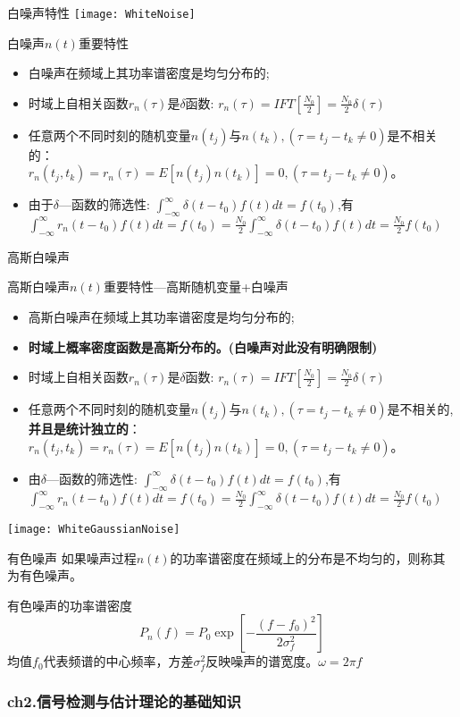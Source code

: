 \begin{frame}{白噪声特性}
\texttt{[image: WhiteNoise]}
\begin{block}{白噪声$n(t)$重要特性}
	\begin{itemize}
		\item 白噪声在频域上其功率谱密度是均匀分布的;
		\item 时域上自相关函数$r_n(\tau)$是$\delta$函数: $r_n(\tau)=IFT[\frac{N_0}{2}]=\frac{N_0}{2}\delta(\tau)$
		\item 任意两个不同时刻的随机变量$n(t_j)$与$n(t_k),(\tau=t_j-t_k\ne 0)$是不相关的：\\
		$r_n(t_j,t_k)=r_n(\tau)=E[n(t_j)n(t_k)]=0,(\tau=t_j-t_k\ne 0)$。
		\item 由于$\delta$---函数的筛选性: $\int_{-\infty}^{\infty}\delta(t-t_0)f(t)dt=f(t_0)$,有\\
		$\int_{-\infty}^{\infty}r_n(t-t_0)f(t)dt=f(t_0)=\frac{N_0}{2}\int_{-\infty}^{\infty}\delta(t-t_0)f(t)dt=\frac{N_0}{2}f(t_0)$
	\end{itemize}	
\end{block}
\end{frame}

\begin{frame}{高斯白噪声}
\begin{block}{高斯白噪声$n(t)$重要特性---高斯随机变量+白噪声}
	\begin{itemize}
		\item 高斯白噪声在频域上其功率谱密度是均匀分布的;
		\item \textbf{时域上概率密度函数是高斯分布的。(白噪声对此没有明确限制)}
		\item 时域上自相关函数$r_n(\tau)$是$\delta$函数: $r_n(\tau)=IFT[\frac{N_0}{2}]=\frac{N_0}{2}\delta(\tau)$
		\item 任意两个不同时刻的随机变量$n(t_j)$与$n(t_k),(\tau=t_j-t_k\ne 0)$是不相关的,\textbf{并且是统计独立的}：\\
		$r_n(t_j,t_k)=r_n(\tau)=E[n(t_j)n(t_k)]=0,(\tau=t_j-t_k\ne 0)$。
		\item 由$\delta$---函数的筛选性: $\int_{-\infty}^{\infty}\delta(t-t_0)f(t)dt=f(t_0)$,有\\
		$\int_{-\infty}^{\infty}r_n(t-t_0)f(t)dt=f(t_0)=\frac{N_0}{2}\int_{-\infty}^{\infty}\delta(t-t_0)f(t)dt=\frac{N_0}{2}f(t_0)$
	\end{itemize}	
\end{block}
\texttt{[image: WhiteGaussianNoise]}
\end{frame}

\begin{frame}{有色噪声}
如果噪声过程$n(t)$的功率谱密度在频域上的分布是不均匀的，则称其为有色噪声。
\begin{block}{有色噪声的功率谱密度}
	\[P_n(f) =P_0\exp\left[-\frac{(f-f_0)^2}{2\sigma_f^2}\right]\]
	均值$f_0$代表频谱的中心频率，方差$\sigma_f^2$反映噪声的谱宽度。$\omega=2\pi f$
\end{block}
\end{frame}

\begin{frame}[shrink]
\frametitle{ch2.信号检测与估计理论的基础知识}
\tableofcontents[hideallsubsections]
\end{frame}


